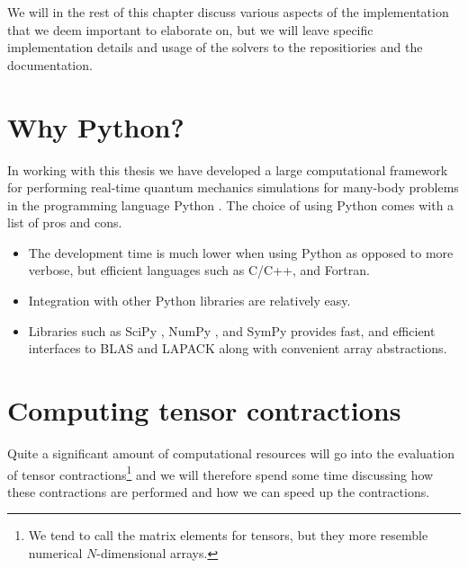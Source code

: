     We will in the rest of this chapter discuss various aspects of the
    implementation that we deem important to elaborate on, but we will leave
    specific implementation details and usage of the solvers to the
    repositiories and the documentation.

    \section{Why Python?}
        In working with this thesis we have developed a large computational
        framework for performing real-time quantum mechanics simulations for
        many-body problems in the programming language Python \cite{python}.
        The choice of using Python comes with a list of pros and cons.
        \begin{itemize}
            \item The development time is much lower when using Python as
                opposed to more verbose, but efficient languages such as C/C++,
                and Fortran.
            \item Integration with other Python libraries are relatively easy.
            \item Libraries such as SciPy \cite{scipy}, NumPy \cite{numpy}, and
                SymPy \cite{sympy} provides fast, and efficient interfaces to
                BLAS and LAPACK along with convenient array abstractions.
        \end{itemize}

    \section{Computing tensor contractions}
        Quite a significant amount of computational resources will go into the
        evaluation of tensor contractions\footnote{%
            We tend to call the matrix elements for tensors, but they more
            resemble numerical $N$-dimensional arrays.%
        } and we will therefore spend some time discussing how these
        contractions are performed and how we can speed up the contractions.

